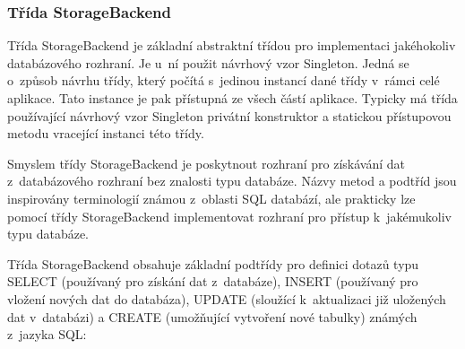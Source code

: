 \subsubsection{Třída StorageBackend}

Třída StorageBackend je základní abstraktní třídou pro implementaci jakéhokoliv databázového rozhraní.
Je u~ní použit návrhový vzor Singleton. %
Jedná se o~způsob návrhu třídy, který počítá s~jedinou instancí dané třídy v~rámci celé aplikace.
Tato instance je pak přístupná ze všech částí aplikace. Typicky má třída používající návrhový
vzor Singleton privátní konstruktor a statickou přístupovou metodu vracející instanci této třídy.

Smyslem třídy StorageBackend je poskytnout rozhraní pro získávání dat z~databázového rozhraní bez znalosti
typu databáze. Názvy metod a podtříd jsou inspirovány terminologií známou
z~oblasti SQL databází, %
 ale prakticky
lze pomocí třídy StorageBackend implementovat rozhraní pro přístup k~jakémukoliv typu databáze.

Třída StorageBackend obsahuje základní podtřídy pro definici dotazů typu SELECT (používaný pro získání
dat z~databáze), INSERT (používaný pro vložení nových dat do databáza), UPDATE (sloužící k~aktualizaci
již uložených dat v~databázi) a CREATE (umožňující vytvoření nové tabulky) známých z~jazyka SQL:

